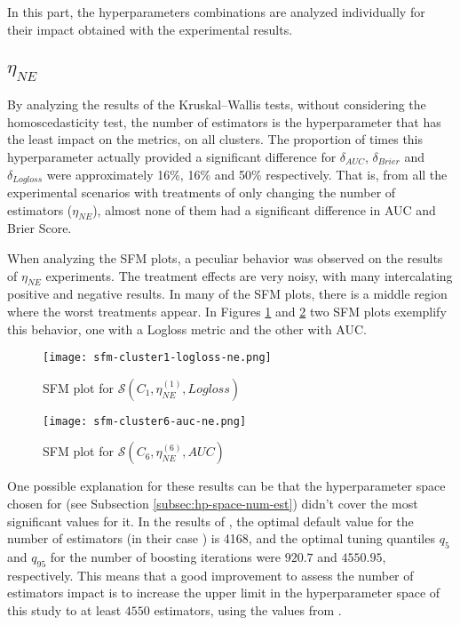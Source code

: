 In this part, the hyperparameters combinations are analyzed individually for their impact obtained with the experimental results.

\subsection{\texorpdfstring{\Large$\eta_{NE}$}{}}
\label{subsec:res-ne}

By analyzing the results of the Kruskal–Wallis tests, without considering the homoscedasticity test, the number of estimators is the hyperparameter that has the least impact on the metrics, on all clusters. The proportion of times this hyperparameter actually provided a significant difference for $\delta_{AUC}$, $\delta_{Brier}$ and $\delta_{Logloss}$ were approximately 16\%, 16\% and 50\% respectively. That is, from all the experimental scenarios with treatments of only changing the number of estimators ($\eta_{NE}$), almost none of them had a significant difference in AUC and Brier Score.

When analyzing the SFM plots, a peculiar behavior was observed on the results of $\eta_{NE}$ experiments. The treatment effects are very noisy, with many intercalating positive and negative results. In many of the SFM plots, there is a middle region where the worst treatments appear. In Figures \ref{fig:sfm-ne-1} and \ref{fig:sfm-ne-2} two SFM plots exemplify this behavior, one with a Logloss metric and the other with AUC. 

\begin{figure}[H]
    \centering
    \texttt{[image: sfm-cluster1-logloss-ne.png]}
    \caption{SFM plot for $\mathcal{S}(C_1, \eta^{(1)}_{NE}, Logloss)$}
    \label{fig:sfm-ne-1}
\end{figure}

\begin{figure}[H]
    \centering
    \texttt{[image: sfm-cluster6-auc-ne.png]}
    \caption{SFM plot for $\mathcal{S}(C_6, \eta^{(6)}_{NE}, AUC)$}
    \label{fig:sfm-ne-2}
\end{figure}

One possible explanation for these results can be that the hyperparameter space chosen for   (see Subsection \ref{subsec:hp-space-num-est}) didn't cover the most significant values for it. In the results of \cite{probst2018tunability}, the optimal default value for the number of estimators (in their case ) is 4168, and the optimal tuning quantiles $q_5$ and $q_{95}$ for the number of boosting iterations were $920.7$ and $4550.95$, respectively. This means that a good improvement to assess the number of estimators impact is to increase the upper limit in the hyperparameter space of this study to at least $4550$ estimators, using the values from \cite{probst2018tunability}.

